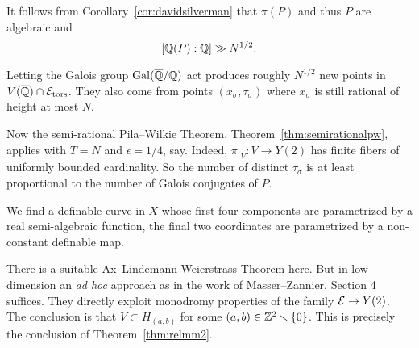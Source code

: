 It follows from Corollary~\ref{cor:davidsilverman} that $\pi(P)$ and thus $P$ are
algebraic and
$$[{\mathbb{Q}}(P):{\mathbb{Q}}]\gg N^{1/2}.$$

Letting the Galois group $\mathrm{Gal}({\overline{\mathbb{Q}}}/{\mathbb{Q}})$ act produces
roughly $N^{1/2}$ new points in $V({\overline{\mathbb{Q}}})\cap
\mathcal{E}_{\mathrm{tors}}$. They also come from points
$(x_\sigma,\tau_\sigma)$ where $x_\sigma$ is still rational of height
at most $N$.

Now the semi-rational Pila--Wilkie Theorem,
Theorem~\ref{thm:semirationalpw}, applies with $T=N$ and $\epsilon
=1/4$, say. Indeed, $\pi|_V\colon V\rightarrow Y(2)$ has finite
fibers of uniformly bounded cardinality.
So the number of distinct $\tau_\sigma$ is at least
proportional to the number of Galois conjugates of $P$.


We find a definable curve  in $X$ whose
first four components are parametrized by a real semi-algebraic
function, the final two
coordinates are parametrized by a  non-constant definable map. 

There is a suitable Ax--Lindemann Weierstrass Theorem here. But in low
dimension an \textit{ad hoc} approach as in the work of
Masser--Zannier, Section 4~\cite{MZ:AJM10} suffices. They directly
exploit monodromy properties of the family ${\mathcal E}\rightarrow Y(2)$. The
conclusion is that $V\subset H_{(a,b)}$ for some
$(a,b)\in{\mathbb{Z}}^2\smallsetminus\{0\}$. This is precisely the conclusion of Theorem~\ref{thm:relmm2}.


